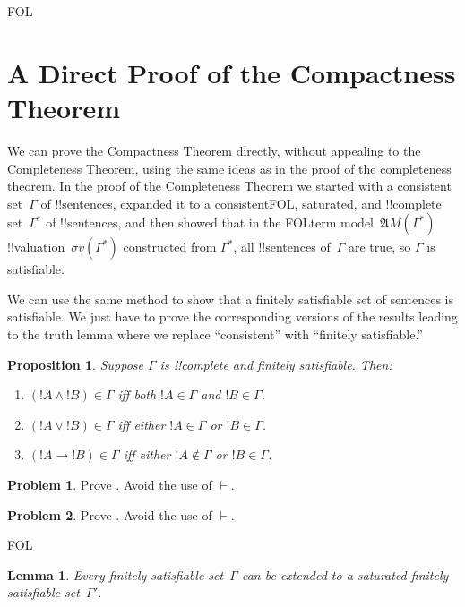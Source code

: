 \documentclass[10pt,a4paper]{article}
\makeatletter
\theoremstyle{plain}
\newtheorem{lem}[thm]{Lemma}
\newtheorem{prop}[thm]{Proposition}
\theoremstyle{definition}
\newtheorem{prob}{Problem}[section]
\theoremstyle{remark}
\newcommand*{\olfileid}[3]{}
\newcommand*{\olsection}[1]{\section*{#1}}
\newcommand*{\ollabel}[1]{\label{#1}}
\newcommand{\olref}{\@ifnextchar[{\olref@i}{\olref@final}}
\def\olref@i[#1]{\@ifnextchar[{\olref@ii}{\olref@final}}
\def\olref@ii[#1]{\@ifnextchar[{\olref@iii}{\olref@final}}
\def\olref@iii[#1]{\olref@final}
\def\olref@final#1{\ref{#1}}
\providecommand{\lif}{\mathbin{\rightarrow}}
\providecommand{\Proves}{\mathrel{\vdash}}
\providecommand{\Struct}{\ensuremath{\mathfrak{A}}}
\providecommand{\iftag}[1]{#1}
\providecommand{\tagitem}[1]{\item[#1]}
\providecommand{\pAssign}{\sigma}
\makeatother
\begin{document}



\iftag{FOL}
      {\olfileid{fol}{com}{cpd}}
      {\olfileid{pl}{com}{cpd}}

\olsection{A Direct Proof of the Compactness Theorem}

We can prove the Compactness Theorem directly, without appealing to
the Completeness Theorem, using the same ideas as in the proof of the
completeness theorem.  In the proof of the Completeness Theorem we
started with a consistent set~$\Gamma$ of !!{sentence}s, expanded it
to a consistent\iftag{FOL}{, saturated,}{} and !!{complete}
set~$\Gamma^*$ of !!{sentence}s, and then showed that in the
\iftag{FOL}{term
  model~$\Struct{M(\Gamma^*)}$}{!!{valuation}~$\pAssign{v(\Gamma^*)}$}
constructed from $\Gamma^*$, all !!{sentence}s of~$\Gamma$ are true,
so $\Gamma$ is satisfiable.

We can use the same method to show that a finitely satisfiable set of
sentences is satisfiable. We just have to prove the corresponding
versions of the results leading to the truth lemma where we replace
``consistent'' with ``finitely satisfiable.''

\begin{prop}
\ollabel{prop:fsat-ccs}
Suppose $\Gamma$ is !!{complete} and finitely satisfiable. Then:
\begin{enumerate}
\tagitem{prvAnd}{$(!A \land !B) \in \Gamma$
  iff both $!A \in \Gamma$ and $!B \in \Gamma$.}{}

\tagitem{prvOr}{$(!A \lor !B) \in \Gamma$ iff
  either $!A \in \Gamma$ or $!B \in \Gamma$.}{}

\tagitem{prvIf}{$(!A \lif !B) \in \Gamma$ iff
  either $!A \notin \Gamma$ or $!B \in \Gamma$.}{}
\end{enumerate}
\end{prop}

\begin{prob}
Prove \olref[fol][com][cpd]{prop:fsat-ccs}. Avoid the use of $\Proves$.
\end{prob}
\tagendprob

\begin{prob}
Prove \olref[pl][com][cpd]{prop:fsat-ccs}. Avoid the use of $\Proves$.
\end{prob}
\tagendprob

\iftag{FOL}{%
\begin{lem}
\ollabel{lem:fsat-henkin} Every finitely satisfiable set~$\Gamma$ can
be extended to a saturated finitely satisfiable set~$\Gamma'$.
\end{lem}
}{}
\end{document}

